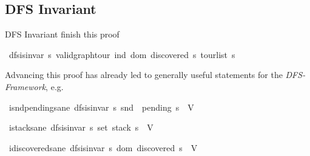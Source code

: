 \documentclass[%
	sans,
	12pt,
]{beamer}
\def\isacartoucheopen{}%
\def\isacartoucheclose{}%
\begin{document}
\subsection{DFS Invariant}
\begin{frame}{DFS Invariant}\pause
	finish this proof\pause
	\vspace{-2mm}
	\begin{isabelle}
		\isamarkupfalse%
		\ {\isacartoucheopen}dfs{\isachardot}is{\isacharunderscore}invar\ {\isacharparenleft}{\isasymlambda}s{\isachardot}\ valid{\isacharunderscore}graph{\isachardot}tour\ {\isacharparenleft}ind{\isacharprime}\ {\isacharparenleft}dom\ {\isacharparenleft}discovered\ s{\isacharparenright}{\isacharparenright}{\isacharparenright}\ {\isacharparenleft}tour{\isacharunderscore}list\ s{\isacharparenright}{\isacharparenright}{\isacartoucheclose}
	\end{isabelle}\pause
	Advancing this proof has already led to generally useful statements for the \textit{DFS-Framework}, e.g.\ \pause
	\begin{isabelle}
		\isamarkupfalse%
		\ i{\isacharunderscore}snd{\isacharunderscore}pending{\isacharunderscore}sane{\isacharcolon}\ {\isacartoucheopen}dfs{\isachardot}is{\isacharunderscore}invar\ {\isacharparenleft}{\isasymlambda}s{\isachardot}\ snd\ {\isacharbackquote}\ {\isacharparenleft}pending\ s{\isacharparenright}\ {\isasymsubseteq}\ V{\isacharparenright}{\isacartoucheclose}
	\end{isabelle}\pause
	\begin{isabelle}
		\isamarkupfalse%
		\ i{\isacharunderscore}stack{\isacharunderscore}sane{\isacharcolon}\ {\isacartoucheopen}dfs{\isachardot}is{\isacharunderscore}invar\ {\isacharparenleft}{\isasymlambda}s{\isachardot}\ set\ {\isacharparenleft}stack\ s{\isacharparenright}\ {\isasymsubseteq}\ V{\isacharparenright}{\isacartoucheclose}
	\end{isabelle}\pause
	\begin{isabelle}
		\isamarkupfalse%
		\ i{\isacharunderscore}discovered{\isacharunderscore}sane{\isacharcolon}\ {\isacartoucheopen}dfs{\isachardot}is{\isacharunderscore}invar\ {\isacharparenleft}{\isasymlambda}s{\isachardot}\ dom\ {\isacharparenleft}discovered\ s{\isacharparenright}\ {\isasymsubseteq}\ V{\isacharparenright}{\isacartoucheclose}
	\end{isabelle}
\end{frame}
\end{document}
